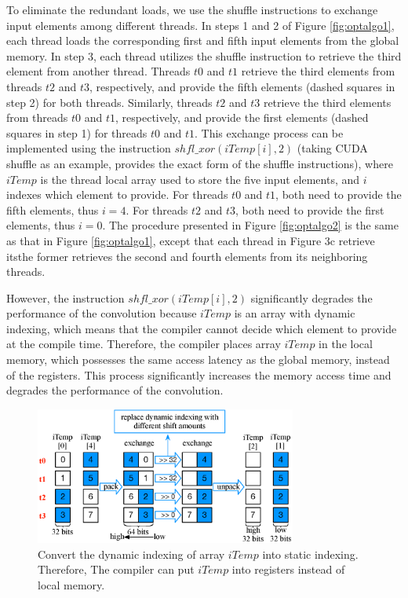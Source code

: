 To eliminate the redundant loads, we use the shuffle instructions to exchange input elements among different threads. In steps 1
and 2 of Figure \ref{fig:optalgo1}, each thread loads the corresponding first and fifth input elements from the global memory. In step 3, each
thread utilizes the shuffle instruction to retrieve the third element from another thread. Threads $t0$ and $t1$ retrieve the third elements
from threads $t2$ and $t3$, respectively, and provide the fifth elements (dashed squares in step 2) for both threads.
Similarly, threads $t2$ and $t3$ retrieve the third elements from threads $t0$ and $t1$, respectively, and provide the first
elements (dashed squares in step 1) for threads $t0$ and $t1$. This exchange process can be implemented using the instruction
$shfl\_xor(iTemp[i],2)$ (taking CUDA shuffle as an example, \cite{CUDAtoolkit} provides the exact form of the shuffle instructions), where $iTemp$ is the thread local
array used to store the five input elements, and $i$ indexes which element to provide. For threads $t0$ and $t1$, both need to provide the fifth
elements, thus $i=4$. For threads $t2$ and $t3$, both need to provide the first elements, thus $i=0$. The procedure presented in Figure  \ref{fig:optalgo2} is the same as that in Figure \ref{fig:optalgo1}, except that each thread in Figure 3c retrieve itsthe former retrieves the second and fourth elements from its neighboring threads.

However, the instruction $shfl\_xor(iTemp[i],2)$ significantly degrades the performance of the convolution because $iTemp$ is an array with
dynamic indexing, which means that the compiler cannot decide which element to provide at the compile time. Therefore, the compiler
places array $iTemp$ in the local memory, which possesses the same access latency as the global memory, instead of the registers. This process significantly increases the memory access time and degrades the performance of the convolution.

\begin{figure}
	\centering
	\includegraphics[width=\columnwidth,height=4.5cm]{./figure/exchange.eps}
\caption{Convert the dynamic indexing of array $iTemp$ into static indexing. Therefore, The compiler can put $iTemp$ into registers instead of local memory.}
\label{fig:exchange}
\end{figure}


